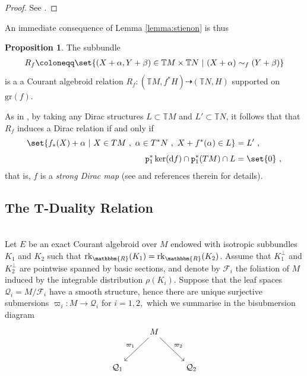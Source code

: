 \documentclass[a4paper, reqno, 11pt]{amsart}
\numberwithin{equation}{section}
\theoremstyle{definition}
\newtheorem{proposition}[equation]{Proposition}
\newcommand{\de}{\mathrm{d}}
\newcommand{\rmp}{\mathtt{p}}
\newcommand{\IR}{\mathbbm{R}}
\newcommand{\IT}{\mathbb{T}}
\newcommand{\cQ}{{\mathcal Q}}
\newcommand{\cF}{{\mathcal F}}
\newcommand{\gr}{\text{gr}}
\newcommand{\rel}{\dashrightarrow}
\newcommand{\rk}{\mathrm{rk}}
\theoremstyle{remark}
\begin{document}
\begin{proof}
    See \cite{Stienon2008}.
\end{proof}

An immediate consequence of Lemma \ref{lemma:stienon} is thus

\begin{proposition}
    The subbundle 
    \begin{align}
        R_f \coloneqq \set{\left( X+ \alpha, Y+ \beta \right) \in \IT M \times \IT N \ \vert \ (X+ \alpha) \sim_f (Y+ \beta)} 
    \end{align}
    is a a Courant algebroid relation $R_f:(\IT M, f^*H)\rel (\IT N, H)$ supported on $\gr(f)$. 
\end{proposition}

As in \cite[Example 2.11]{bursztyn2008courant}, by taking any Dirac structures $L \subset \IT M$ and $L'\subset\IT N$, it follows that that $R_f$ induces a Dirac relation if and only if 
\begin{align}
    \set{f_*(X)+ \alpha  \ | \ X\in TM \ ,\ \alpha \in T^*N \ , \ X+ f^*(\alpha) \in L} &= L' \ , \\[4pt]
     \rmp_1^*\ker(\de f) \cap \rmp_1^*(TM) \cap L &= \set{0}  \ ,
\end{align}
that is, $f$ is a \emph{strong Dirac map} (see \cite{bursztyn2008courant} and references therein for details). 

\medskip

\subsection{The T-Duality Relation}~\\[5pt] \label{subsect:Tdualityrel}
 Let $E$ be an exact Courant algebroid over $M$ endowed with isotropic subbundles $K_1$ and $K_2$ such that
$\rk_\IR (K_1) = \rk_\IR(K_2)$.    
Assume that $K_1^\perp$ and $K_2^\perp$ are pointwise spanned by basic sections, and denote by $\cF_i$ the foliation of $M$ induced by the integrable distribution $\rho(K_i).$ Suppose that the leaf spaces $\cQ_i=M / \cF_i$ have a smooth structure, hence there are unique surjective submersions $\varpi_i \colon M \to \cQ_i$ for $i=1,2,$ which we summarise in the bisubmersion diagram
\begin{equation}
    \begin{tikzcd} [row sep = 1cm]
  &\arrow[swap]{dl}{\varpi_1} M \arrow{dr}{\varpi_2}&   \\
\cQ_1 & & \cQ_2 
 \end{tikzcd}
\end{equation}
\end{document}
